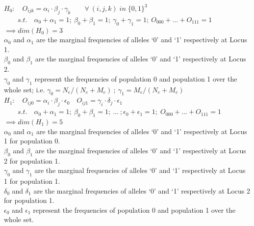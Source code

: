 \documentclass[a4paper,12pt]{article}
\begin{document}
\noindent $H_0: \quad O_{ijk} = \alpha_{i}\cdot\beta_{j}\cdot\gamma_{k} \qquad \forall \:(i,j,k)\; in\; \{0,1\}^3$ \\

 $ \qquad s.t. \quad \alpha_{0} +\alpha_{1} = 1; \: \beta_{0} + \beta_{1} = 1; \: \gamma_{0} + \gamma_{1} = 1; \: O_{000}
 +...+O_{111}=1    $\\
 
 $ \implies dim(H_{0}) = 3 $\\
 
 \noindent $\alpha_{0}$ and $\alpha_{1}$ are the marginal frequencies of alleles `0' and `1' respectively at Locus 1.\\
 \noindent $\beta_{0}$ and $\beta_{1}$ are the marginal frequencies of alleles `0' and `1' respectively at Locus 2.\\
 \noindent  $\gamma_{0}$ and $\gamma_{1}$ represent the frequencies of population 0 and population 1 over the whole set; i.e.
 $\gamma_{0} = N_e / (N_e + M_e) \: ; \: \gamma_{1} = M_e / (N_e + M_e)$  \\
 
 \noindent $H_1: \quad O_{ij0} = \alpha_{i}\cdot\beta_{j}\cdot\epsilon_{0} \quad O_{ij1} = \gamma_{i}\cdot\delta_{j}\cdot\epsilon_{1}$\\
 
 $ \qquad s.t.  \quad \alpha_{0} +\alpha_{1} = 1; \: \beta_{0} + \beta_{1} = 1; \: ... \:; \epsilon_{0} + \epsilon_{1} = 1; \; O_{000}+...+O_{111}=1    $\\
 
  $ \implies dim(H_{1}) = 5 $\\

 \noindent $\alpha_{0}$ and $\alpha_{1}$ are the marginal frequencies of alleles `0' and `1' respectively at Locus 1 for population 0.\\
 \noindent $\beta_{0}$ and $\beta_{1}$ are the marginal frequencies of alleles `0' and `1' respectively at Locus 2 for population 1.\\
  \noindent $\gamma_{0}$ and $\gamma_{1}$ are the marginal frequencies of alleles `0' and `1' respectively at Locus 1 for population 1.\\
 \noindent $\delta_{0}$ and $\delta_{1}$ are the marginal frequencies of alleles `0' and `1' respectively at Locus 2 for population 1.\\
 \noindent  $\epsilon_{0}$ and $\epsilon_{1}$ represent the frequencies of population 0 and population 1 over the whole set.\\
 
\end{document}
